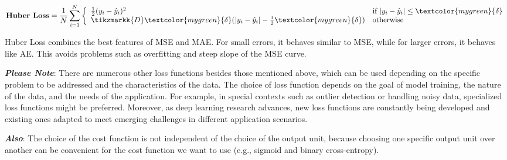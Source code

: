 {\Large

\begin{equation*}
\text{\textbf{Huber Loss}} = \frac{1}{N} \sum_{i=1}^{N} \left\{
\begin{array}{ll}
    \frac{1}{2} (y_i - \hat{y}_i)^2 & \text{if } |y_i - \hat{y}_i| \leq \textcolor{mygreen}{\delta} \\
    \tikzmarkk{D}\textcolor{mygreen}{\delta} (|y_i - \hat{y}_i| - \frac{1}{2} \textcolor{mygreen}{\delta}) & \text{otherwise}
\end{array}
\right.
\end{equation*}

}
\vspace{1cm}

Huber Loss combines the best features of MSE and MAE. For small errors, it behaves similar to MSE, while for larger errors, it behaves like AE. This avoids problems such as overfitting and steep slope of the MSE curve.

\textit{\textbf{Please Note}}: There are numerous other loss functions besides those mentioned above, which can be used depending on the specific problem to be addressed and the characteristics of the data. The choice of loss function depends on the goal of model training, the nature of the data, and the needs of the application. For example, in special contexts such as outlier detection or handling noisy data, specialized loss functions might be preferred. Moreover, as deep learning research advances, new loss functions are constantly being developed and existing ones adapted to meet emerging challenges in different application scenarios. 

\textit{\textbf{Also}}: The choice of the cost function is not independent of the choice of the output unit, because choosing one specific output unit over another can be convenient for the cost function we want to use (e.g., sigmoid and binary cross-entropy).

